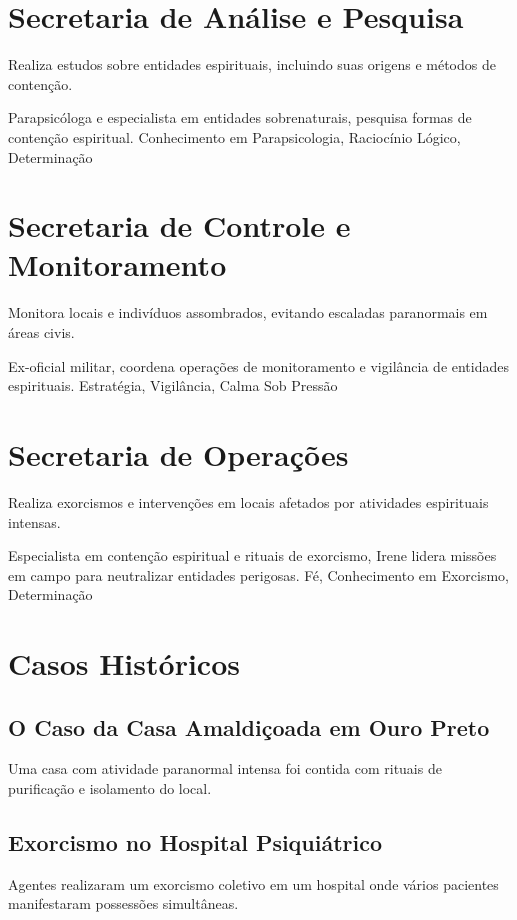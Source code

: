 \section{Secretaria de Análise e Pesquisa}
Realiza estudos sobre entidades espirituais, incluindo suas origens e métodos de contenção.

{Parapsicóloga e especialista em entidades sobrenaturais, pesquisa formas de contenção espiritual.}
{Conhecimento em Parapsicologia, Raciocínio Lógico, Determinação}

\section{Secretaria de Controle e Monitoramento}
Monitora locais e indivíduos assombrados, evitando escaladas paranormais em áreas civis.

{Ex-oficial militar, coordena operações de monitoramento e vigilância de entidades espirituais.}
{Estratégia, Vigilância, Calma Sob Pressão}

\section{Secretaria de Operações}
Realiza exorcismos e intervenções em locais afetados por atividades espirituais intensas.

{Especialista em contenção espiritual e rituais de exorcismo, Irene lidera missões em campo para neutralizar entidades perigosas.}
{Fé, Conhecimento em Exorcismo, Determinação}

\section{Casos Históricos}

\subsection{O Caso da Casa Amaldiçoada em Ouro Preto} Uma casa com atividade paranormal intensa foi contida com rituais de purificação e isolamento do local.

\subsection{Exorcismo no Hospital Psiquiátrico} Agentes realizaram um exorcismo coletivo em um hospital onde vários pacientes manifestaram possessões simultâneas.

